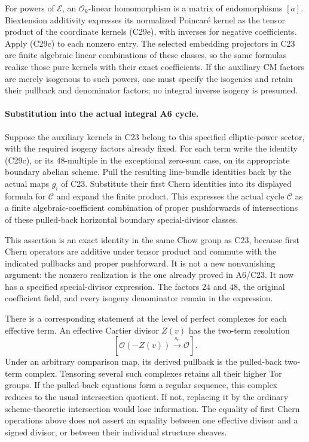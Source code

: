 For powers of $\mathcal E$, an
$\mathcal O_k$-linear homomorphism is a matrix of
endomorphisms $[a]$. Biextension additivity expresses
its normalized Poincar\'e kernel as the tensor product
of the coordinate kernels (C29e), with inverses for
negative coefficients. Apply (C29c) to each nonzero
entry. The selected embedding projectors in C23 are
finite algebraic linear combinations of these classes,
so the same formulas realize those pure kernels with
their exact coefficients. If the auxiliary CM factors
are merely isogenous to such powers, one must specify
the isogenies and retain their pullback and denominator
factors; no integral inverse isogeny is presumed.

\paragraph{Substitution into the actual integral A6 cycle.}
Suppose the auxiliary kernels in C23 belong to this
specified elliptic-power sector, with the required
isogeny factors already fixed. For each term write the
identity (C29c), or its $48$-multiple in the exceptional
zero-sum case, on its appropriate boundary abelian
scheme. Pull the resulting line-bundle identities back
by the actual maps $g_i$ of C23. Substitute their first
Chern identities into its displayed formula for
$\mathcal C$ and expand the finite product.
This expresses the actual cycle $\mathcal C$ as a
finite algebraic-coefficient combination of proper
pushforwards of intersections of these pulled-back
horizontal boundary special-divisor classes.

This assertion is an exact identity in the same Chow
group as C23, because first Chern operators are additive
under tensor product and commute with the indicated
pullbacks and proper pushforward. It is not a new
nonvanishing argument: the nonzero realization is the
one already proved in A6/C23. It now has a specified
special-divisor expression. The factors $24$ and $48$,
the original coefficient field, and every isogeny
denominator remain in the expression.

There is a corresponding statement at the level of
perfect complexes for each effective term. An effective
Cartier divisor $Z(v)$ has the two-term resolution
\[
          [\mathcal O(-Z(v))\xrightarrow{s_v}\mathcal O].
\]
Under an arbitrary comparison map, its derived pullback
is the pulled-back two-term complex. Tensoring several
such complexes retains all their higher Tor groups.
If the pulled-back equations form a regular sequence,
this complex reduces to the usual intersection quotient.
If not, replacing it by the ordinary scheme-theoretic
intersection would lose information. The equality of
first Chern operations above does not assert an equality
between one effective divisor and a signed divisor, or
between their individual structure sheaves.

